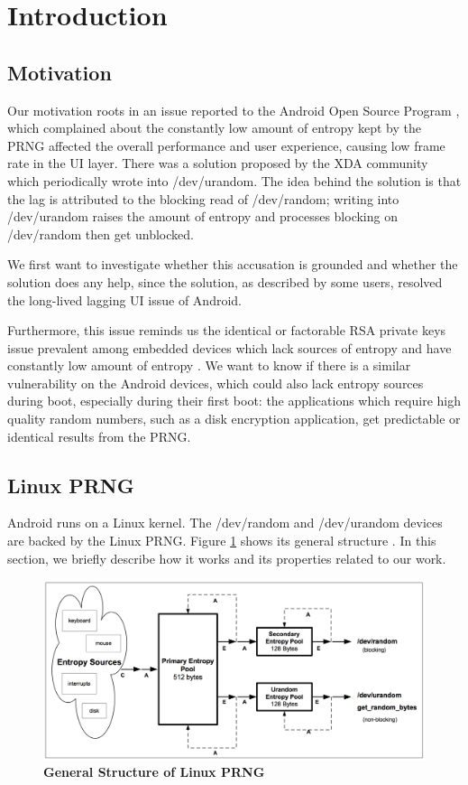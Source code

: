 \section{Introduction}
\subsection{Motivation}

Our motivation roots in an issue reported to the Android Open Source Program \cite{issue42265} , which complained about the constantly low amount of entropy kept by the PRNG affected the overall performance and user experience, causing low frame rate in the UI layer. There was a solution proposed by the XDA community which periodically wrote into /dev/urandom. The idea behind the solution is that the lag is attributed to the blocking read of /dev/random; writing into /dev/urandom raises the amount of entropy and processes blocking on /dev/random then get unblocked. 

We first want to investigate whether this accusation is grounded and whether the solution does any help, since the solution, as described by some users, resolved the long-lived lagging UI issue of Android.

Furthermore, this issue reminds us the identical or factorable RSA private keys issue prevalent among embedded devices which lack sources of entropy and have constantly low amount of entropy \cite{weakkeys12}. We want to know if there is a similar vulnerability on the Android devices, which could also lack entropy sources during boot, especially during their first boot: the applications which require high quality random numbers, such as a disk encryption application,  get predictable or identical results from the PRNG.

\subsection{Linux PRNG}
Android runs on a Linux kernel. The /dev/random and /dev/urandom devices are backed by the Linux PRNG. Figure \ref{figprng} shows its general structure \cite{Gutterman06}. In this section, we briefly describe how it works and its properties related to our work.

\begin{figure}[t]
\begin{center}
\includegraphics[scale=0.27]{prng.png}
\end{center}
\caption{{\bf General Structure of Linux PRNG}}
\label{figprng}
\end{figure}


